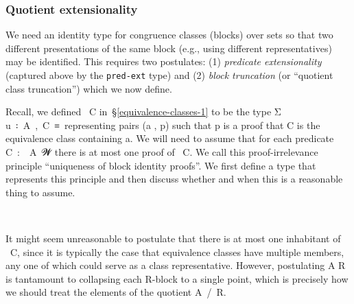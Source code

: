 \subsubsection{Quotient extensionality}\label{quotient-extensionality}

We need an identity type for congruence classes (blocks) over sets so that two different presentations of the same block (e.g., using different representatives) may be identified. This requires two postulates: (1) \emph{predicate
extensionality} (captured above by the \texttt{pred-ext} type) and (2) \emph{block truncation} (or ``quotient class truncation'') which we now define.

Recall, we defined ~\ab C in~\S\ref{equivalence-classes-1} to be the type \af Σ \ab u~\af ꞉~\ab A~\af ,~\ab C~\ad ≡~\af [~\ab u~\af ] representing pairs (\ab a , \ab p) such that \ab p is a proof that \ab C is the equivalence class containing \ab a. We will need to assume that for each predicate \ab C~\as :~~\ab A~\ab 𝓦 there is at most one proof of ~\ab C. We call this proof-irrelevance principle ``uniqueness of block identity proofs''. We first define a type that represents this principle and then discuss whether and when this is a reasonable thing to assume.
\ccpad
\begin{code}%
\>[0]\AgdaSpace{}%
\AgdaSymbol{:}\AgdaSpace{}%
\AgdaSymbol{\{}\AgdaSpace{}%
\AgdaSpace{}%
\AgdaSymbol{:}\AgdaSpace{}%
\AgdaSymbol{\}(}\AgdaSpace{}%
\AgdaSymbol{:}\AgdaSpace{}%
\AgdaSpace{}%
\AgdaSymbol{)(}\AgdaSpace{}%
\AgdaSymbol{:}\AgdaSpace{}%
\AgdaSpace{}%
\AgdaSpace{}%
\AgdaSpace{}%
\AgdaSymbol{)}\AgdaSpace{}%
\AgdaSpace{}%
\AgdaSpace{}%
\AgdaSpace{}%
\AgdaSpace{}%
\AgdaSpace{}%
\<%
\\
\>[0]\AgdaSpace{}%
\AgdaSymbol{\{}\AgdaSymbol{\}}\AgdaSpace{}%
\AgdaSpace{}%
\AgdaSpace{}%
\AgdaSymbol{=}\AgdaSpace{}%
\AgdaSpace{}%
\AgdaSymbol{(}\AgdaSpace{}%
\AgdaSymbol{:}\AgdaSpace{}%
\AgdaSpace{}%
\AgdaSpace{}%
\AgdaSymbol{)}\AgdaSpace{}%
\AgdaSpace{}%
\AgdaSpace{}%
\AgdaSymbol{(}\AgdaSpace{}%
\AgdaSpace{}%
\AgdaSymbol{\{}\AgdaSymbol{\})}\<%
\end{code}
\ccpad
It might seem unreasonable to postulate that there is at most one inhabitant of ~\ab C, since it is typically the case that equivalence classes have multiple members, any one of which could serve as a class representative.  However, postulating  \ab A \ab R is tantamount to collapsing each \ab R-block to a single point, which is precisely how we should treat the elements of the quotient \ab A~\af /~\ab R.

